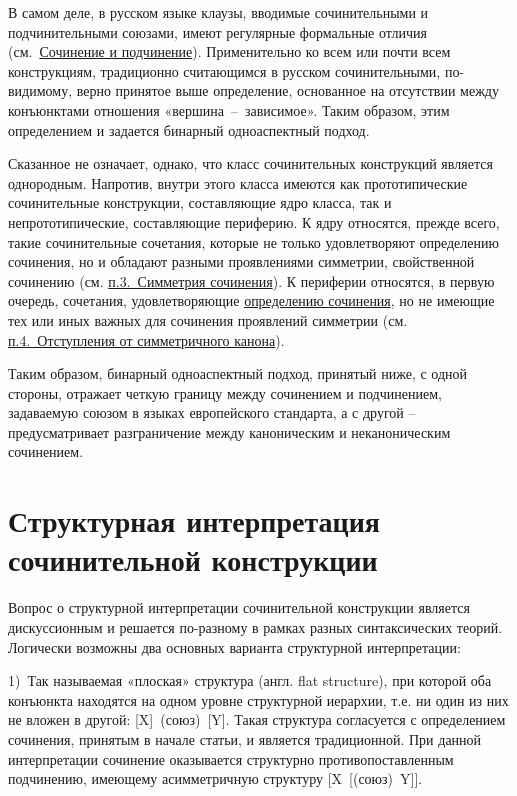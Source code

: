 В самом деле, в русском языке клаузы, вводимые сочинительными и
подчинительными союзами, имеют регулярные формальные отличия
(см.~\underline{Сочинение и подчинение}). Применительно ко всем или
почти всем конструкциям, традиционно считающимся в русском
сочинительными, по-видимому, верно принятое выше определение, основанное
на отсутствии между конъюнктами отношения «вершина~--~зависимое». Таким
образом, этим определением и задается бинарный одноаспектный подход.

Сказанное не означает, однако, что класс сочинительных конструкций
является однородным. Напротив, внутри этого класса имеются как
прототипические сочинительные конструкции, составляющие ядро класса, так
и непрототипические, составляющие периферию. К ядру относятся, прежде
всего, такие сочинительные сочетания, которые не только удовлетворяют
определению сочинения, но и обладают разными проявлениями симметрии,
свойственной сочинению (см. \underline{п.3.~Симметрия сочинения}). К
периферии относятся, в первую очередь, сочетания, удовлетворяющие
\underline{определению сочинения}, но не имеющие тех или иных важных для
сочинения проявлений симметрии (см. \underline{п.4.~Отступления от
  симметричного канона}).

Таким образом, бинарный одноаспектный подход, принятый ниже, с одной
стороны, отражает четкую границу между сочинением и подчинением,
задаваемую союзом в языках европейского стандарта, а с другой --
предусматривает разграничение между каноническим и неканоническим
сочинением.

\section{Структурная интерпретация сочинительной
  конструкции}\label{ux441ux442ux440ux443ux43aux442ux443ux440ux43dux430ux44f-ux438ux43dux442ux435ux440ux43fux440ux435ux442ux430ux446ux438ux44f-ux441ux43eux447ux438ux43dux438ux442ux435ux43bux44cux43dux43eux439-ux43aux43eux43dux441ux442ux440ux443ux43aux446ux438ux438}

Вопрос о структурной интерпретации сочинительной конструкции является
дискуссионным и решается по-разному в рамках разных синтаксических
теорий. Логически возможны два основных варианта структурной
интерпретации:

1)~Так называемая «плоская» структура (англ. flat structure), при
которой оба конъюнкта находятся на одном уровне структурной иерархии,
т.е. ни один из них не вложен в другой: {[}X{]}~(союз)~{[}Y{]}. Такая
структура согласуется с определением сочинения, принятым в начале
статьи, и является традиционной. При данной интерпретации сочинение
оказывается структурно противопоставленным подчинению, имеющему
асимметричную структуру {[}X~{[}(союз)~Y{]}{]}.

